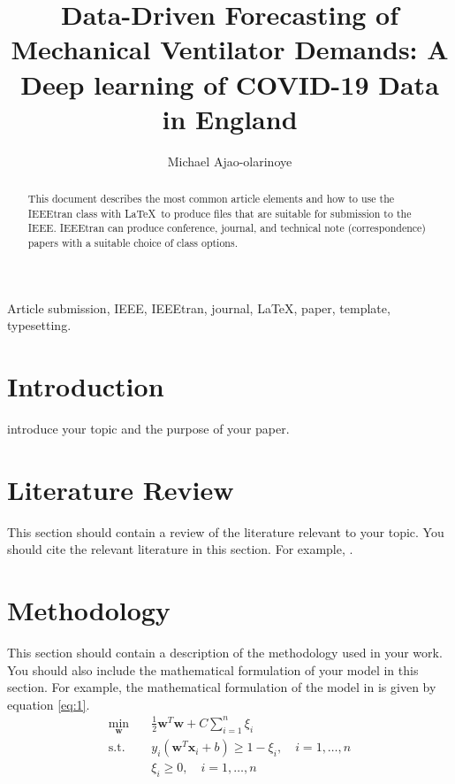 \documentclass[lettersize, journal]{IEEEtran}
\begin{document}
\title{Data-Driven Forecasting of Mechanical Ventilator Demands: A Deep learning of COVID-19 Data in England}
\author{Michael Ajao-olarinoye}

\maketitle
\thispagestyle{empty}


\begin{abstract}
    This document describes the most common article elements and how to use the IEEEtran class with \LaTeX \ to produce files that are suitable for submission to the IEEE.  IEEEtran can produce conference, journal, and technical note (correspondence) papers with a suitable choice of class options.
\end{abstract}

\begin{IEEEkeywords}
    Article submission, IEEE, IEEEtran, journal, \LaTeX, paper, template, typesetting.
\end{IEEEkeywords}

\section{Introduction}
 introduce your topic and the purpose of your paper.

\section{Literature Review}
\label{sec:lit_review}
This section should contain a review of the literature relevant to your topic. You should cite the relevant literature in this section. For example, \cite{ajao2020}.

\section{Methodology}
\label{sec:methodology}
This section should contain a description of the methodology used in your work. You should also include the mathematical formulation of your model in this section. For example, the mathematical formulation of the model in \cite{ajao2020} is given by equation \ref{eq:1}.
\begin{equation}
    \label{eq:1}
    \begin{split}
        \min_{\mathbf{w}} \quad & \frac{1}{2} \mathbf{w}^T \mathbf{w} + C \sum_{i=1}^{n} \xi_i \\
        \text{s.t.} \quad & y_i(\mathbf{w}^T \mathbf{x}_i + b) \geq 1 - \xi_i, \quad i = 1, \dots, n \\
        & \xi_i \geq 0, \quad i = 1, \dots, n
    \end{split}
\end{equation}
\end{document}
